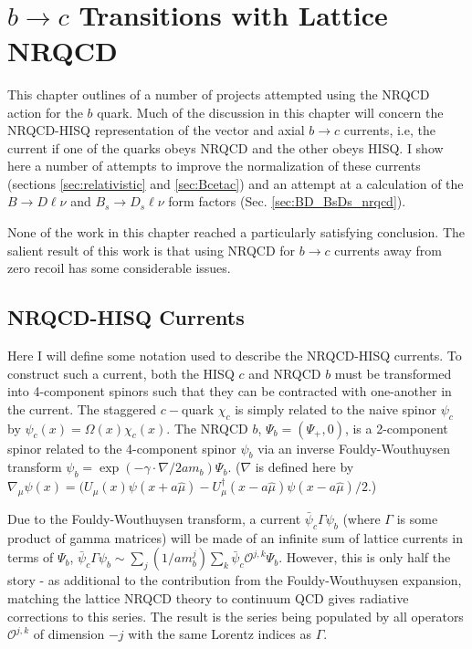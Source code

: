 ﻿﻿\chapter{$b\to c$ Transitions with Lattice NRQCD}
\label{chap:nrqcd}

This chapter outlines of a number of projects attempted using the NRQCD action for the $b$ quark. Much of the discussion in this chapter will concern the NRQCD-HISQ representation of the vector and axial $b\to c$ currents, i.e, the current if one of the quarks obeys NRQCD and the other obeys HISQ. I show here a number of attempts to improve the normalization of these currents (sections \ref{sec:relativistic} and \ref{sec:Bcetac}) and an attempt at a calculation of the $B\to D\ell\nu$ and $B_s\to D_s \ell\nu$ form factors (Sec. \ref{sec:BD_BsDs_nrqcd}).

None of the work in this chapter reached a particularly satisfying conclusion. The salient result of this work is that using NRQCD for $b \to c$ currents away from zero recoil has some considerable issues.

\section{NRQCD-HISQ Currents}

Here I will define some notation used to describe the NRQCD-HISQ currents. To construct such a current, both the HISQ $c$ and NRQCD $b$ must be transformed into 4-component spinors such that they can be contracted with one-another in the current. The staggered $c-$quark $\chi_c$ is simply related to the naive spinor $\psi_c$ by $\psi_c(x)=\Omega(x) \chi_c(x)$. The NRQCD $b$, $\Psi_{b} = ( \Psi_+, 0 )$, is a 2-component spinor related to the 4-component spinor $\psi_b$ via an inverse Fouldy-Wouthuysen transform $\psi_b = \exp( - \gamma\cdot \nabla / 2am_b )\Psi_b$. ($\nabla$ is defined here by $\nabla_{\mu} \psi(x) = (U_{\mu}(x)\psi(x+a\hat{\mu})-U^{\dagger}_{\mu}(x-a\hat{\mu})\psi(x-a\hat{\mu})/2$.)

Due to the Fouldy-Wouthuysen transform, a current $\bar{\psi}_c \Gamma \psi_b$ (where $\Gamma$ is some product of gamma matrices) will be made of an infinite sum of lattice currents in terms of $\Psi_b$, $\bar{\psi}_c \Gamma \psi_b \sim \sum_j (1/am_b^j) \sum_k \bar{\psi}_c \mathcal{O}^{j,k} \Psi_b$. However, this is only half the story - as additional to the contribution from the Fouldy-Wouthuysen expansion, matching the lattice NRQCD theory to continuum QCD gives radiative corrections to this series. The result is the series being populated by all operators $\mathcal{O}^{j,k}$ of dimension $-j$ with the same Lorentz indices as $\Gamma$. 

